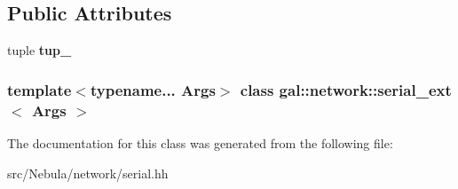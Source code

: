 \subsection*{\-Public \-Attributes}
\begin{DoxyCompactItemize}
\item 
\hypertarget{classgal_1_1network_1_1serial__ext_ac091f912da995c0f8dad27fc225f2fba}{tuple {\bfseries tup\-\_\-}}\label{classgal_1_1network_1_1serial__ext_ac091f912da995c0f8dad27fc225f2fba}

\end{DoxyCompactItemize}
\subsubsection*{template$<$typename... \-Args$>$ class gal\-::network\-::serial\-\_\-ext$<$ Args $>$}



\-The documentation for this class was generated from the following file\-:\begin{DoxyCompactItemize}
\item 
src/\-Nebula/network/serial.\-hh\end{DoxyCompactItemize}
